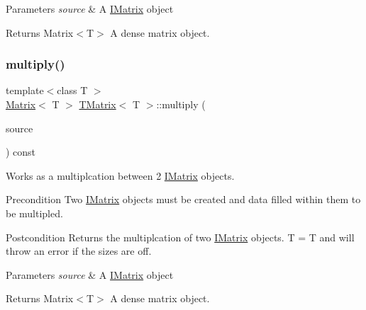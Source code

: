 \begin{DoxyParams}{Parameters}
{\em source} & A \mbox{\hyperlink{class_i_matrix}{I\+Matrix}} object \\
\hline
\end{DoxyParams}
\begin{DoxyReturn}{Returns}
Matrix$<$\+T$>$ A dense matrix object. 
\end{DoxyReturn}
\mbox{\label{class_t_matrix_a62b64ac4f66c3a029263672f63126665}} 
\subsubsection{\texorpdfstring{multiply()}{multiply()}\hspace{0.1cm}{\footnotesize\ttfamily [6/6]}}
{\footnotesize\ttfamily template$<$class T $>$ \\
\mbox{\hyperlink{class_matrix}{Matrix}}$<$ T $>$ \mbox{\hyperlink{class_t_matrix}{T\+Matrix}}$<$ T $>$\+::multiply (\begin{DoxyParamCaption}\item[{const \mbox{\hyperlink{class_i_matrix}{I\+Matrix}}$<$ \mbox{\hyperlink{class_d_matrix}{D\+Matrix}}$<$ T $>$, T $>$ \&}]{source }\end{DoxyParamCaption}) const}



Works as a multiplcation between 2 \mbox{\hyperlink{class_i_matrix}{I\+Matrix}} objects. 

\begin{DoxyPrecond}{Precondition}
Two \mbox{\hyperlink{class_i_matrix}{I\+Matrix}} objects must be created and data filled within them to be multipled. 
\end{DoxyPrecond}
\begin{DoxyPostcond}{Postcondition}
Returns the multiplcation of two \mbox{\hyperlink{class_i_matrix}{I\+Matrix}} objects. T = T and will throw an error if the sizes are off.
\end{DoxyPostcond}

\begin{DoxyParams}{Parameters}
{\em source} & A \mbox{\hyperlink{class_i_matrix}{I\+Matrix}} object \\
\hline
\end{DoxyParams}
\begin{DoxyReturn}{Returns}
Matrix$<$\+T$>$ A dense matrix object. 
\end{DoxyReturn}
\mbox{\label{class_t_matrix_a4d6a92d764a31d148199dc55298771db}} 

